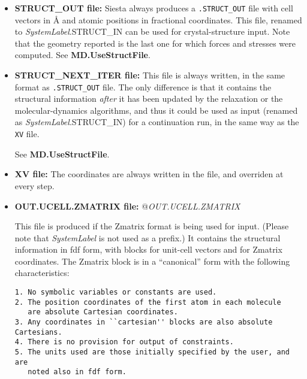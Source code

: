 \begin{itemize}

\item\textbf{STRUCT\_OUT file:}
Siesta always produces a \texttt{.STRUCT\_OUT} file with cell vectors in {\AA}
and atomic positions in fractional coordinates. This file, renamed to
\textit{SystemLabel}.STRUCT\_IN can be used for crystal-structure input.
Note that the geometry reported is the last one for which forces and
stresses were computed.
See \textbf{MD.UseStructFile}.

\item\textbf{STRUCT\_NEXT\_ITER file:}
This file is always written, in the same format as \texttt{.STRUCT\_OUT}
file. The only difference is that it contains the structural
information {\em after} it has been updated by the relaxation or the
molecular-dynamics
algorithms, and thus it could be used as input (renamed as
\textit{SystemLabel}.STRUCT\_IN) for a continuation run, in the same way
as the \texttt{XV} file.

See \textbf{MD.UseStructFile}.

\item\textbf{XV file:} The coordinates are always written in the  file, and overriden at every step.

\item\textbf{OUT.UCELL.ZMATRIX file:}
@{\textit{OUT.UCELL.ZMATRIX}}

This file is produced if the Zmatrix format is being used for
input. (Please note that \textit{SystemLabel} is not used as a prefix.)
It contains the structural information in fdf form, with
blocks for unit-cell vectors and for Zmatrix coordinates. The
Zmatrix block is in a ``canonical'' form with the following
characteristics:

\begin{verbatim}
1. No symbolic variables or constants are used.
2. The position coordinates of the first atom in each molecule
   are absolute Cartesian coordinates.
3. Any coordinates in ``cartesian'' blocks are also absolute Cartesians.
4. There is no provision for output of constraints.
5. The units used are those initially specified by the user, and are
   noted also in fdf form.
\end{verbatim}


\end{itemize}
